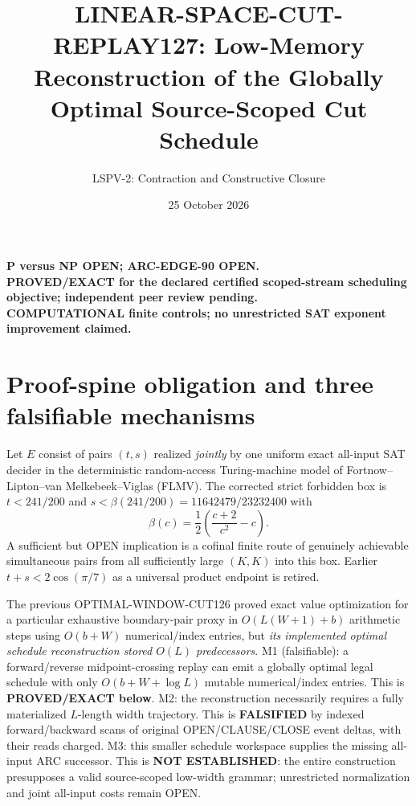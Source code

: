\documentclass[11pt]{article}
\title{LINEAR-SPACE-CUT-REPLAY127: Low-Memory Reconstruction of the Globally Optimal Source-Scoped Cut Schedule}
\author{LSPV-2: Contraction and Constructive Closure}
\date{25 October 2026}
\begin{document}
\maketitle
\begin{center}
\textbf{P versus NP OPEN; ARC-EDGE-90 OPEN.}\\
\textbf{PROVED/EXACT for the declared certified scoped-stream scheduling objective; independent peer review pending.}\\
\textbf{COMPUTATIONAL finite controls; no unrestricted SAT exponent improvement claimed.}
\end{center}

\section{Proof-spine obligation and three falsifiable mechanisms}
Let $E$ consist of pairs $(t,s)$ realized \emph{jointly} by one uniform exact all-input SAT decider in the deterministic random-access Turing-machine model of Fortnow--Lipton--van Melkebeek--Viglas (FLMV).
The corrected strict forbidden box is $t<241/200$ and $s<\beta(241/200)=11642479/23232400$ with
\[
\beta(c)=\frac12\left(\frac{c+2}{c^2}-c\right).
\]
A sufficient but OPEN implication is a cofinal finite route of genuinely achievable simultaneous pairs from all sufficiently large $(K,K)$ into this box. Earlier $t+s<2\cos(\pi/7)$ as a universal product endpoint is retired.

The previous OPTIMAL-WINDOW-CUT126 proved exact value optimization for a particular exhaustive boundary-pair proxy in $O(L(W+1)+b)$ arithmetic steps using $O(b+W)$ numerical/index entries, but \emph{its implemented optimal schedule reconstruction stored $O(L)$ predecessors}.
M1 (falsifiable): a forward/reverse midpoint-crossing replay can emit a globally optimal legal schedule with only $O(b+W+\log L)$ mutable numerical/index entries. This is \textbf{PROVED/EXACT below}.
M2: the reconstruction necessarily requires a fully materialized $L$-length width trajectory. This is \textbf{FALSIFIED} by indexed forward/backward scans of original OPEN/CLAUSE/CLOSE event deltas, with their reads charged.
M3: this smaller schedule workspace supplies the missing all-input ARC successor. This is \textbf{NOT ESTABLISHED}: the entire construction presupposes a valid source-scoped low-width grammar; unrestricted normalization and joint all-input costs remain OPEN.
\end{document}
